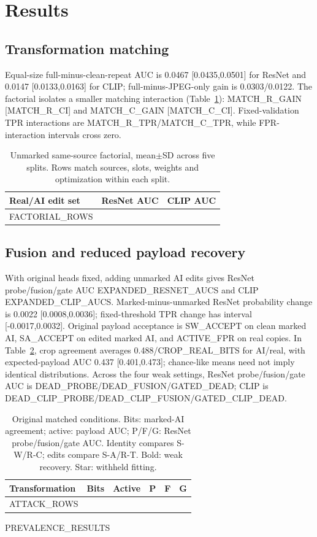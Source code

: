 \documentclass[conference]{IEEEtran}
\begin{document}
\section{Results}
\subsection{Transformation matching}
Equal-size full-minus-clean-repeat AUC is 0.0467 [0.0435,0.0501] for
ResNet and 0.0147 [0.0133,0.0163] for CLIP; full-minus-JPEG-only gain is
0.0303/0.0122. The factorial isolates a smaller matching interaction
(Table~\ref{tab:factorial}): {{MATCH_R_GAIN}} [{{MATCH_R_CI}}] and
{{MATCH_C_GAIN}} [{{MATCH_C_CI}}]. Fixed-validation TPR interactions are
{{MATCH_R_TPR}}/{{MATCH_C_TPR}}, while FPR-interaction intervals cross zero.
\begin{table}[t]
\caption{Unmarked same-source factorial, mean$\pm$SD across five splits.
Rows match sources, slots, weights and optimization within each split.}
\label{tab:factorial}\centering\footnotesize
\begin{tabular}{lcc}\toprule
Real/AI edit set & ResNet AUC & CLIP AUC\\\midrule
{{FACTORIAL_ROWS}}
\bottomrule\end{tabular}\end{table}

\subsection{Fusion and reduced payload recovery}
With original heads fixed, adding unmarked AI edits gives ResNet
probe/fusion/gate AUC {{EXPANDED_RESNET_AUCS}} and CLIP {{EXPANDED_CLIP_AUCS}}.
Marked-minus-unmarked ResNet probability change is 0.0022 [0.0008,0.0036];
fixed-threshold TPR change has interval [-0.0017,0.0032].
Original payload acceptance is {{SW_ACCEPT}} on clean marked AI,
{{SA_ACCEPT}} on edited marked AI, and {{ACTIVE_FPR}} on real copies.
In Table~\ref{tab:attacks}, crop agreement averages 0.488/{{CROP_REAL_BITS}}
for AI/real, with expected-payload AUC 0.437 [0.401,0.473]; chance-like means
need not imply identical distributions. Across the four weak settings, ResNet
probe/fusion/gate AUC is {{DEAD_PROBE}}/{{DEAD_FUSION}}/{{GATED_DEAD}};
CLIP is {{DEAD_CLIP_PROBE}}/{{DEAD_CLIP_FUSION}}/{{GATED_CLIP_DEAD}}.
\begin{table}[t]
\caption{Original matched conditions. Bits: marked-AI agreement; active:
payload AUC; P/F/G: ResNet probe/fusion/gate AUC. Identity compares
S-W/R-C; edits compare S-A/R-T. Bold: weak recovery. Star: withheld fitting.}
\label{tab:attacks}\centering\footnotesize\setlength{\tabcolsep}{3pt}
\begin{tabular}{lrrrrr}\toprule
Transformation & Bits & Active & P & F & G\\\midrule
{{ATTACK_ROWS}}
\bottomrule\end{tabular}\end{table}
{{PREVALENCE_RESULTS}}
\end{document}
